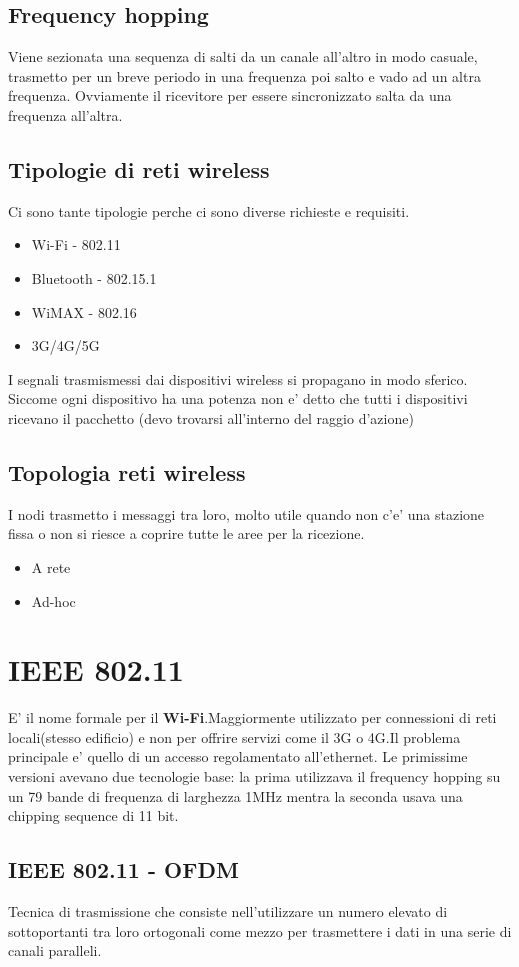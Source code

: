 \subsection{Frequency hopping}
Viene sezionata una sequenza di salti da un canale all'altro in modo casuale, trasmetto per un breve periodo in una frequenza poi salto e vado ad un altra frequenza. Ovviamente il ricevitore per essere sincronizzato salta da una frequenza all'altra.
\subsection{Tipologie di reti wireless}
Ci sono tante tipologie perche ci sono diverse richieste e requisiti.
\begin{itemize}
  \item Wi-Fi - 802.11
  \item Bluetooth - 802.15.1
  \item WiMAX - 802.16
  \item 3G/4G/5G
\end{itemize}
I segnali trasmismessi dai dispositivi wireless si propagano in modo sferico. Siccome ogni dispositivo ha una potenza non e' detto che tutti i dispositivi ricevano il pacchetto (devo trovarsi all'interno del raggio d'azione)
\subsection{Topologia reti wireless}
I nodi trasmetto i messaggi tra loro, molto utile quando non c'e' una stazione fissa o non si riesce a coprire tutte le aree per la ricezione.
\begin{itemize}
  \item A rete
  \item Ad-hoc
\end{itemize}
\section{IEEE 802.11}
E' il nome formale per il \textbf{Wi-Fi}.Maggiormente utilizzato per connessioni di reti locali(stesso edificio) e non per offrire servizi come il 3G o 4G.Il problema principale e' quello di un accesso regolamentato all'ethernet. Le primissime versioni avevano due tecnologie base: la prima utilizzava il frequency hopping su un 79 bande di frequenza di larghezza 1MHz mentra la seconda usava una chipping sequence di 11 bit.
\subsection{IEEE 802.11 - OFDM}
\begin{definition}
  Tecnica di trasmissione che consiste nell'utilizzare un numero elevato di sottoportanti tra loro ortogonali come mezzo per trasmettere i dati in una serie di canali paralleli.
\end{definition}
